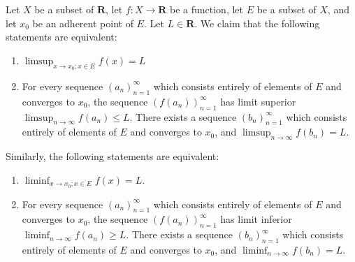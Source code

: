 \begin{additional corollary}\label{ac 9.3.2}
Let \(X\) be a subset of \(\mathbf{R}\), let \(f : X \to \mathbf{R}\) be a function, let \(E\) be a subset of \(X\), and let \(x_0\) be an adherent point of \(E\).
Let \(L \in \mathbf{R}\).
We claim that the following statements are equivalent:
\begin{enumerate}
    \item \(\limsup_{x \to x_0 ; x \in E} f(x) = L\)
    \item For every sequence \((a_n)_{n = 1}^\infty\) which consists entirely of elements of \(E\) and converges to \(x_0\), the sequence \((f(a_n))_{n = 1}^\infty\) has limit superior \(\limsup_{n \to \infty} f(a_n) \leq L\).
          There exists a sequence \((b_n)_{n = 1}^\infty\) which consists entirely of elements of \(E\) and converges to \(x_0\), and \(\limsup_{n \to \infty} f(b_n) = L\).
\end{enumerate}
Similarly, the following statements are equivalent:
\begin{enumerate}
    \item \(\liminf_{x \to x_0 ; x \in E} f(x) = L\).
    \item For every sequence \((a_n)_{n = 1}^\infty\) which consists entirely of elements of \(E\) and converges to \(x_0\), the sequence \((f(a_n))_{n = 1}^\infty\) has limit inferior \(\liminf_{n \to \infty} f(a_n) \geq L\).
          There exists a sequence \((b_n)_{n = 1}^\infty\) which consists entirely of elements of \(E\) and converges to \(x_0\), and \(\liminf_{n \to \infty} f(b_n) = L\).
\end{enumerate}
\end{additional corollary}

